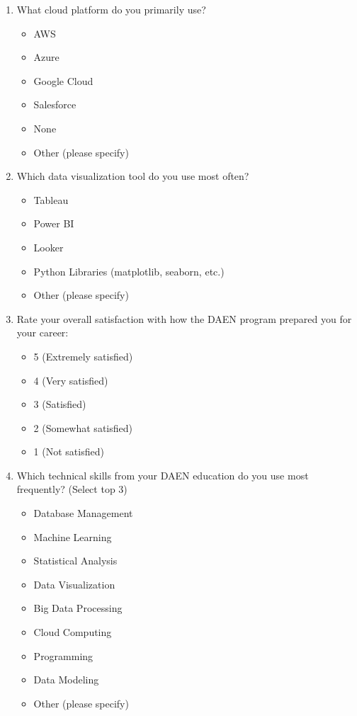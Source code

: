 \documentclass[12pt,a4paper]{article}
\begin{document}
\begin{enumerate}
\item What cloud platform do you primarily use?
\begin{itemize}
    \item AWS
    \item Azure
    \item Google Cloud
    \item Salesforce
    \item None
    \item Other (please specify)
\end{itemize}

\item Which data visualization tool do you use most often?
\begin{itemize}
    \item Tableau
    \item Power BI
    \item Looker
    \item Python Libraries (matplotlib, seaborn, etc.)
    \item Other (please specify)
\end{itemize}

\item Rate your overall satisfaction with how the DAEN program prepared you for your career:
\begin{itemize}
    \item 5 (Extremely satisfied)
    \item 4 (Very satisfied)
    \item 3 (Satisfied)
    \item 2 (Somewhat satisfied)
    \item 1 (Not satisfied)
\end{itemize}

\item Which technical skills from your DAEN education do you use most frequently? (Select top 3)
\begin{itemize}
    \item Database Management
    \item Machine Learning
    \item Statistical Analysis
    \item Data Visualization
    \item Big Data Processing
    \item Cloud Computing
    \item Programming
    \item Data Modeling
    \item Other (please specify)
\end{itemize}


\end{enumerate}
\end{document}

